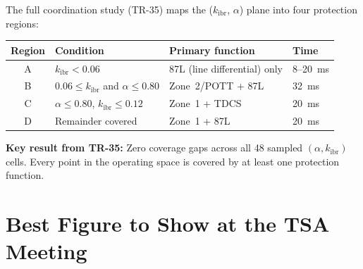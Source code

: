 \documentclass[12pt,a4paper]{article}
\newcommand{\kibr}{k_\mathrm{ibr}}
\begin{document}
The full coordination study (TR-35) maps the ($\kibr$, $\alpha$) plane into four protection regions:
\begin{center}
\begin{tabular}{@{}clll@{}}
\toprule
\textbf{Region} & \textbf{Condition} & \textbf{Primary function} & \textbf{Time} \\
\midrule
A & $\kibr < 0.06$ & 87L (line differential) only & 8--20~ms \\
B & $0.06 \leq \kibr$ and $\alpha \leq 0.80$ & Zone~2/POTT + 87L & 32~ms \\
C & $\alpha \leq 0.80$, $\kibr \leq 0.12$ & Zone~1 + TDCS & 20~ms \\
D & Remainder covered & Zone~1 + 87L & 20~ms \\
\bottomrule
\end{tabular}
\end{center}
\textbf{Key result from TR-35:} Zero coverage gaps across all 48 sampled $(\alpha, \kibr)$ cells. Every point in the operating space is covered by at least one protection function.

\section{Best Figure to Show at the TSA Meeting}
\end{document}
